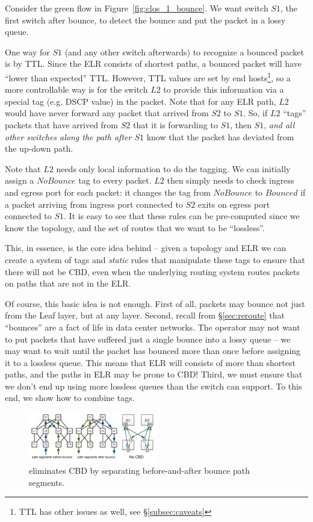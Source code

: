 Consider the green flow in Figure~\ref{fig:clos_1_bounce}.  We want switch $S1$,
the first switch after bounce, to detect the bounce and put the packet in a
lossy queue.

One way for $S1$ (and any other switch afterwards) to recognize a bounced packet
is by TTL. Since the ELR consists of shortest paths, a bounced packet will have
``lower than expected'' TTL. However, TTL values are set by end
hosts\footnote{TTL has other issues as well, see \S\ref{subsec:caveats}}, so a
more controllable way is for the switch $L2$ to provide this information via a
special tag (e.g. DSCP value) in the packet. Note that for any ELR path, $L2$
would have never forward any packet that arrived from $S2$ to $S1$. So, if $L2$
``tags'' packets that have arrived from $S2$ that it is forwarding to $S1$, then
$S1$, {\em and all other switches along the path after $S1$} know that the
packet has deviated from the up-down path.

Note that $L2$ needs only local information to do the tagging. We can initially
assign a $NoBounce$ tag to every packet. $L2$ then simply needs to check ingress
and egress port for each packet: it changes the tag from $NoBounce$ to $Bounced$
if a packet arriving from ingress port connected to $S2$ exits on egress port
connected to $S1$.  It is easy to see that these rules can be pre-computed since
we know the topology, and the set of routes that we want to be ``lossless''.

This, in essence, is the core idea behind \sysname{} -- given a topology and ELR
we can create a system of tags and {\em static} rules that manipulate these tags
to ensure that there will not be CBD, even when the underlying routing system
routes packets on paths that are not in the ELR.

Of course, this basic idea is not enough. First of all, packets may bounce not
just from the Leaf layer, but at any layer. Second, recall from
\S\ref{sec:reroute} that ``bounces'' are a fact of life in data center networks.
The operator may not want to put packets that have suffered just a single bounce
into a lossy queue -- we may want to wait until the packet has bounced more than
once before assigning it to a lossless queue. This means that ELR will consists
of more than shortest paths, and the paths in ELR may be prone to CBD!
Third, we must ensure that we
don't end up using more lossless queues than the switch can support. To this
end, we show how to combine tags.

\begin{figure}[t]
	\centering
	\includegraphics[width=0.5\textwidth] {figs/cbd_b}
	\caption{\sysname{} eliminates CBD by separating before-and-after bounce path segments.}
	\label{fig:clos_tagger}
\end{figure}

